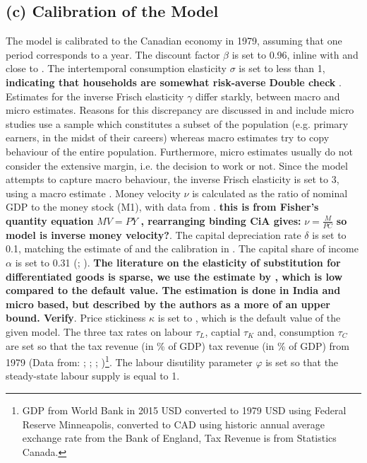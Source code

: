 \documentclass[12pt]{article}
\begin{document}
\subsection*{(c) Calibration of the Model}
The model is calibrated to the Canadian economy in 1979, assuming that one period corresponds to a year. 
The discount factor $\beta$ is set to 0.96, inline with \textcite{someOilDemandSupply2023} and close to \textcite{corriganToTEMIIIBank2021}. 
The intertemporal consumption elasticity $\sigma$ is set to less than 1, \textbf{indicating that households are somewhat risk-averse Double check} \parencite{thimmeIntertemporalSubstitutionConsumption2017}.
Estimates for the inverse Frisch elasticity $\gamma$ differ starkly, between macro and micro estimates. Reasons for this discrepancy are discussed in \cite{...} and 
include micro studies use a sample which constitutes a subset of the population (e.g. primary earners, in the midst of their careers) whereas macro estimates try
 to copy behaviour of the entire population. Furthermore, micro estimates usually do not consider the extensive margin, i.e. the decision to work or not. Since the model attempts to capture
macro behaviour, the inverse Frisch elasticity is set to 3, using a macro estimate \cite{...}. Money velocity $\nu$ is calculated as the ratio of nominal GDP to the money stock (M1), with data from \cite{...}.
\textbf{this is from Fisher's quantity equation} $MV =PY$ \textbf{, rearranging binding CiA gives: }$\nu = \frac{M}{PC}$ \textbf{so model is inverse money velocity?}.
The capital depreciation rate $\delta$ is set to 0.1, matching the estimate of \cite{...} and the calibration in \cite{...}.
The capital share of income $\alpha$ is set to 0.31 (\cite{fredst.louisShareLabourCompensation2021}; \cite{feenstraNextGenerationPenn2015}). 
\textbf{The literature on the elasticity of substitution for differentiated goods is sparse, we use the estimate by \cite{...}, which is low compared to the default value. The estimation is done in India and 
micro based, but described by the authors as a more of an upper bound. Verify}. 
Price stickiness $\kappa$ is set to , which is the default value of the given model.
The three tax rates on labour $\tau_L$, captial $\tau_K$ and, consumption $\tau_C$ are set so that the tax revenue (in \% of GDP) tax revenue (in \% of GDP) from 1979 
(Data from: \cite{bankofenglandCanadianDollarData2021}; \cite{federalreservebankofminneapolisInflationCalculatorFederal}; \cite{statisticscanadaNationalBalanceSheet2012}; 
\cite{worldbankgroupWorldBankNational})\footnote{GDP from World Bank in 2015 USD converted to 1979 USD using Federal Reserve Minneapolis, converted to CAD using historic annual average exchange rate from 
the Bank of England, Tax Revenue is from Statistics Canada.}.
The labour disutility parameter $\varphi$ is set so that the steady-state labour supply is equal to 1.
\end{document}
